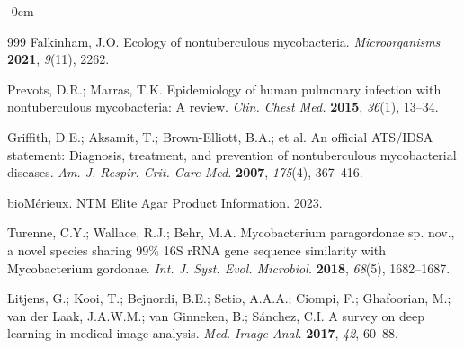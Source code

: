 \documentclass[journal,article,submit,pdftex,moreauthors]{Definitions/mdpi}
\begin{document}
\begin{adjustwidth}{-\extralength}{0cm}



% 


\begin{thebibliography}{999}
Falkinham, J.O. Ecology of nontuberculous mycobacteria. {\em Microorganisms} {\bf 2021}, {\em 9}(11), 2262.

Prevots, D.R.; Marras, T.K. Epidemiology of human pulmonary infection with nontuberculous mycobacteria: A review. {\em Clin. Chest Med.} {\bf 2015}, {\em 36}(1), 13–34.

Griffith, D.E.; Aksamit, T.; Brown-Elliott, B.A.; et al. An official ATS/IDSA statement: Diagnosis, treatment, and prevention of nontuberculous mycobacterial diseases. {\em Am. J. Respir. Crit. Care Med.} {\bf 2007}, {\em 175}(4), 367–416.

bioMérieux. NTM Elite Agar Product Information. 2023.

Turenne, C.Y.; Wallace, R.J.; Behr, M.A. Mycobacterium paragordonae sp. nov., a novel species sharing 99\% 16S rRNA gene sequence similarity with Mycobacterium gordonae. {\em Int. J. Syst. Evol. Microbiol.} {\bf 2018}, {\em 68}(5), 1682–1687.

Litjens, G.; Kooi, T.; Bejnordi, B.E.; Setio, A.A.A.; Ciompi, F.; Ghafoorian, M.; van der Laak, J.A.W.M.; van Ginneken, B.; Sánchez, C.I. A survey on deep learning in medical image analysis. {\em Med. Image Anal.} {\bf 2017}, {\em 42}, 60–88.


\end{thebibliography}
\end{adjustwidth}
\end{document}
